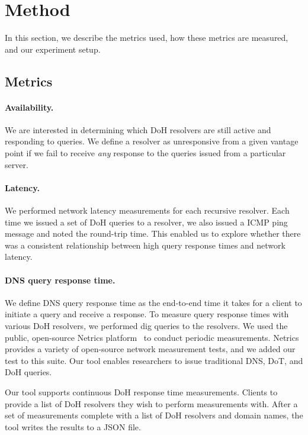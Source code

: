 \section{Method}\label{sec:method} In this section, we describe the metrics
used, how these metrics are measured, and our experiment setup.

\subsection{Metrics} 

\paragraph{Availability.} We are interested in determining which DoH
resolvers are still active and responding to queries.  We define a resolver as
unresponsive from a given vantage point if we fail to receive \emph{any}
response to the queries issued from a particular server.

\paragraph{Latency.} We
performed network latency measurements for each recursive resolver.  Each time
we issued a set of DoH queries to a resolver, we also issued a ICMP ping
message and noted the round-trip time.  This enabled us to explore
whether there was a consistent relationship between high query response times
and network latency.

\paragraph{DNS query response time.} We define DNS query response time as the
end-to-end time it takes for a client to initiate a query and receive a
response.  To measure query response times with various DoH resolvers, we
performed dig queries to the resolvers. We used the public, open-source Netrics
platform~\cite{netrics} to conduct periodic measurements. Netrics
provides a variety of open-source network measurement tests, and we added our 
test to this suite. Our tool enables researchers to issue
traditional DNS, DoT, and DoH queries.

Our tool supports continuous DoH response time measurements. Clients to provide
a list of DoH resolvers they wish to perform measurements with. After a set of 
measurements complete with a list of DoH resolvers and domain names, the tool
writes the results to a JSON file.


